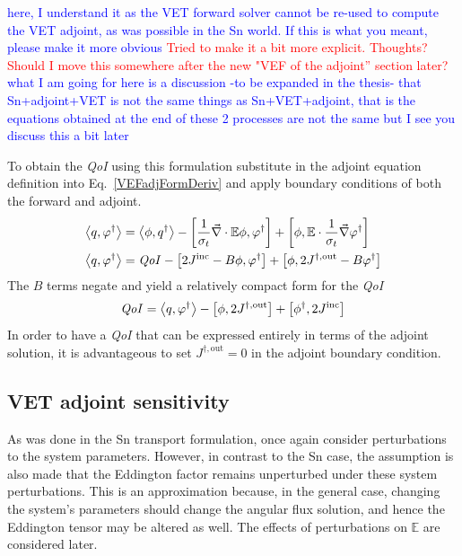 \documentclass[12pt]{report}
\newcommand{\bra}{\left\langle}
\newcommand{\ket}{\right\rangle}
\newcommand{\sbra}{\left[}
\newcommand{\sket}{\right]}
\renewcommand{\div}{\vec{\nabla} \cdot}
\newcommand{\grad}{\vec{\nabla}}
\newcommand{\vefadj}{\varphi^\dag}
\newcommand{\Edd}{\mathbb{E}}
\newcommand{\sigt}{\sigma_t}
\newcommand{\scalSource}{q}
\newcommand{\scalResp}{q^\dag}
\newcommand{\qoi}{{\it QoI}\xspace}
\newcommand{\comment}[2]{\marginpar{\textcolor{#2}{$\star$}}\textcolor{#2}{#1}\newline}
\newcommand{\iwh}[1]{\comment{#1}{red}}
\newcommand{\jcr}[1]{\comment{#1}{blue}}
\newcommand{\iwh}[1]{\phantom{a}}
\newcommand{\jcr}[1]{\phantom{a}}
\begin{document}
\jcr{here, I understand it as the VET forward solver cannot be re-used to compute the VET adjoint,
as was possible in the Sn world. If this is what you meant, please make it more obvious}
\iwh{Tried to make it a bit more explicit. Thoughts? Should I move this somewhere after the new "VEF of the adjoint'' section later?} 
\jcr{what I am going for here is a discussion -to be expanded in the thesis- that Sn+adjoint+VET is not the same things as Sn+VET+adjoint, that is the equations obtained at the end
of these 2 processes are not the same but I see you discuss this a bit later}

To obtain the \qoi using this formulation substitute in the adjoint equation definition into Eq.~\eqref{VEFadjFormDeriv} and apply boundary conditions of both the forward and adjoint.
\begin{equation}
\label{VETQoIAdjUnpDeriv}
\begin{split}
 \bra \scalSource , \vefadj \ket &=   \bra \phi, \scalResp \ket - \sbra \frac{1}{\sigt}\div \Edd \phi, \vefadj \sket + \sbra \phi, \Edd \cdot \frac{1}{\sigt} \grad \vefadj \sket \\
\bra \scalSource , \vefadj \ket &=   \qoi - \sbra 2J^{\text{inc}} - B \phi, \vefadj \sket + \sbra \phi, 2J^{\dag,\text{out}} - B \vefadj \sket \\
\end{split}
\end{equation}
The $B$ terms negate and yield a relatively compact form for the \qoi
\begin{equation}
\label{VETQoIAdj}
\qoi=\bra \scalSource , \vefadj \ket 
- \sbra \phi, 2J^{\dag,\text{out}} \sket  + \sbra \phi^\dag, 2J^{\text{inc}} \sket
\end{equation}
In order to have a \qoi that can be expressed entirely in terms of the adjoint solution, it is advantageous to 
set $J^{\dag,\text{out}}=0$ in the adjoint boundary condition.

\subsection{VET adjoint sensitivity}

As was done in the Sn transport formulation, once again consider perturbations to the system parameters. However, in contrast to the Sn case, the assumption is also made that the Eddington factor remains unperturbed under these system perturbations. This is an approximation because, in the general case, changing the system's parameters should change the angular flux solution, and hence
the Eddington tensor may be altered as well. The effects of perturbations on $\Edd$ are considered later.
\end{document}
